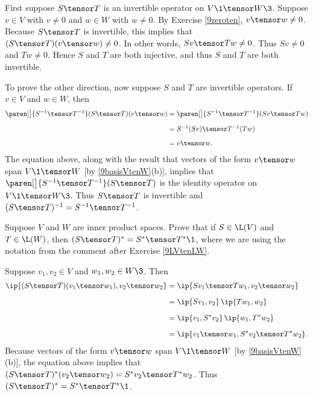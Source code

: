 \begin{Solution}
First suppose $S \tensor T$ is an invertible operator on $V\1 \tensor W\3$. Suppose $v \in V$ with $v \ne 0$ and
$w \in W$ with $w \ne 0$. By Exercise \ref{9zeroten}, $v \tensor w \ne 0$. Because $S \tensor T$ is invertible, this implies that $(S \tensor T)(v \tensor w) \ne 0$. In other words, $Sv \tensor Tw \ne 0$. Thus $Sv \ne 0$ and $Tw \ne 0$. Hence $S$ and $T$ are both injective, and thus $S$ and $T$ are both invertible.

To prove the other direction, now suppose $S$ and $T$ are invertible operators. If $v \in V$ and $w \in W$, then
\begin{align*}
\paren[\big]{ S^{-1} \tensor T^{-1} }(S \tensor T)(v \tensor w)
&= \paren[\big]{ S^{-1} \tensor T^{-1} }( Sv \tensor Tw) \\[6bp]
&= S^{-1}(Sv) \tensor T^{-1}(Tw) \\[6bp]
&= v \tensor w.
\end{align*}
The equation above, along with the result that vectors of the form $v \tensor w$ span $V\1 \tensor W$ [by \ref{9basisVtenW}(b)], implies that $\paren[\big]{ S^{-1} \tensor T^{-1} }(S \tensor T)$ is the identity operator on $V\1 \tensor W\3$. Thus $S \tensor T$ is invertible and $(S \tensor T)^{-1} = S^{-1} \tensor T^{-1}$.
\end{Solution}

\exercise
Suppose $V$ and $W$ are inner product spaces. Prove that if $S \in \L(V)$ and $T \in \L(W)$, then $(S \tensor T)^* = S^* \tensor T^*\1$, where we are using the notation from the comment after Exercise \ref{9LVtenLW}.\label{9STstar}

\begin{Solution}
Suppose $v_1, v_2 \in V$ and $w_1, w_2 \in W\3$. Then
\begin{align*}
\ip{ (S \tensor T)(v_1 \tensor w_1), v_2 \tensor w_2 } &= \ip{ Sv_1 \tensor Tw_1, v_2 \tensor w_2 } \\[6bp]
&= \ip{Sv_1, v_2} \, \ip{Tw_1, w_2} \\[6bp]
&= \ip{ v_1, S^* v_2} \, \ip{ w_1, T^* w_2 } \\[6bp]
&= \ip{v_1 \tensor w_1, S^* v_2 \tensor T^* w_2 }.
\end{align*}
Because vectors of the form $v \tensor w$ span $V\1 \tensor W$ [by \ref{9basisVtenW}(b)], the equation above implies that $(S \tensor T)^*(v_2 \tensor w_2) = S^*v_2 \tensor T^* w_2$. Thus $(S \tensor T)^* = S^* \tensor T^*\1$.
\end{Solution}

